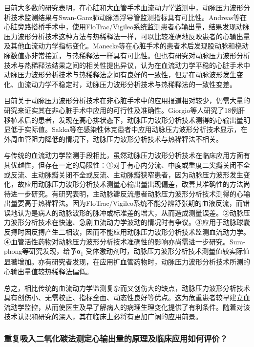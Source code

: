 目前大多数的研究表明，在心脏和大血管手术血流动力学监测中，动脉压力波形分析技术监测结果与Swan-Ganz肺动脉漂浮导管监测指标具有可比性。Andreas等在心脏旁路搭桥手术中，使用FloTrac/Vigileo系统监测患者心输出量，结果发现动脉压力波形分析技术这种方法与热稀释法一样，可以比较准确地反映患者的心输出量及其他血流动力学指标变化。Manecke等在心脏手术的患者术后发现股动脉和桡动脉数值亦非常接近，与热稀释法一样具有可比性。但也有研究对动脉压力波形分析技术与热稀释法结果之间的相关性提出异议，认为在血流动力学平稳的心脏手术中动脉压力波形分析技术与热稀释法之间有良好的一致性，但是在动脉波形发生变化、血流动力学不稳定时，动脉压力波形分析技术与热稀释法的一致性变差。

目前关于动脉压力波形分析技术在非心脏手术中的应用报道相对较少，仍需大量的研究来证实其在非心脏手术中应用的可行性及准确性。Giorgio等人研究了18例肝移植术后的患者，发现在高心排状态下，动脉压力波形分析技术测得的心输出量明显低于实际值。Sakka等在感染性休克患者中应用动脉压力波形分析技术显示，在外周血管阻力降低的情况下，动脉压力波形分析技术与热稀释法不相关。

与传统的血流动力学监测手段相比，虽然动脉压力波形分析技术在临床应用方面有其优越性，但存在一定的局限性：①对于有心内分流、中度或重度二尖瓣关闭不全或反流、主动脉瓣关闭不全或反流、主动脉瓣狭窄患者，因为动脉压力波形发生变化，故应用动脉压力波形分析技术测量心输出量出现偏差，改善其准确性的方法尚待进一步研究。有研究表明，主动脉瓣反流患者动脉压力波形分析技术测得的心输出量要高于热稀释法。因为FloTrac/Vigileo系统不能分辨舒张期的血液反流，而错误地认为是病人的动脉波形的脉冲或标准差的增大，从而造成测量误差。②动脉压力波形分析技术在快速、急剧血流动力学波动的情况时有争议。③应用于动脉球囊反搏时因反搏产生二相波，因而不能应用动脉压力波形分析技术监测血流动力学。④血管活性药物对动脉压力波形分析技术准确性的影响亦尚需进一步研究。Sura-phong等研究发现，给予α\textsubscript{1}
受体激动剂时，动脉压力波形分析技术测量值较实际值显著增加。亦有研究者发现，在应用扩血管药物时，动脉压力波形分析技术所测的心输出量值较热稀释法偏低。

总之，相比传统的血流动力学监测复杂而又创伤大的缺点，动脉压力波形分析技术具有创伤小、无需校正、指标全面、动态性良好等优点。这为危重患者较早建立血流动学监控，从而使医生及早了解病人的病理生理变化提供了有利条件。随着对该技术认识和研究的深入，其在临床上必将有更加广阔的应用前景。

\subsubsection{重复吸入二氧化碳法测定心输出量的原理及临床应用如何评价？}

